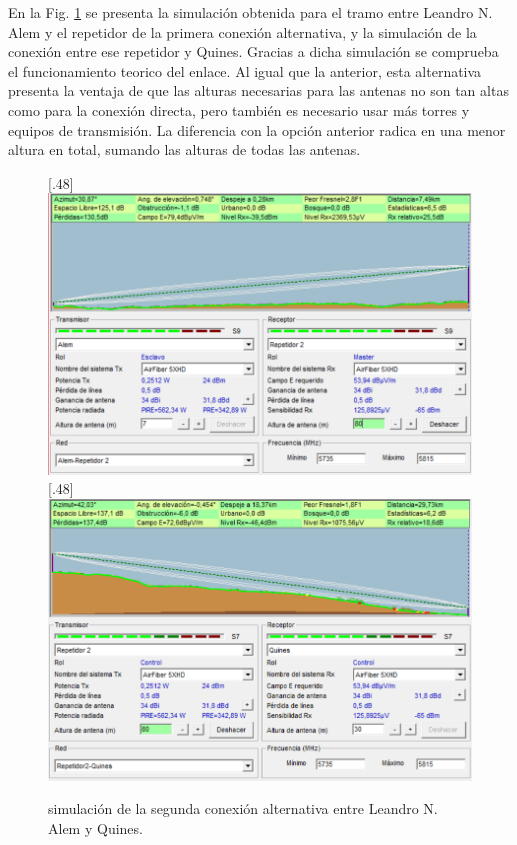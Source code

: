 \documentclass[11pt,a4paper]{article}
\begin{document}
En la Fig. \ref{fig:sim_alt2} se presenta la simulación obtenida para el tramo entre Leandro N. Alem y el repetidor de la primera conexión alternativa, y la simulación de la conexión entre ese repetidor y Quines.
Gracias a dicha simulación se comprueba el funcionamiento teorico del enlace.
Al igual que la anterior, esta alternativa presenta la ventaja de que las alturas necesarias para las antenas no son tan altas como para la conexión directa, pero también es necesario usar más torres y equipos de transmisión. 
La diferencia con la opción anterior radica en una menor altura en total, sumando las alturas de todas las antenas.

\begin{figure}[ht!]
  \centering
  [.48\linewidth]{\includegraphics[height=10\baselineskip]{fotos_ema/sim_alt2_alem_rep}}%
  \hfill%
  [.48\linewidth]{\includegraphics[height=10\baselineskip]{fotos_ema/sim_alt2_rep_quines}}
  \caption{simulación de la segunda conexión alternativa entre Leandro N. Alem y Quines.}
  \label{fig:sim_alt2}
\end{figure}
\end{document}
